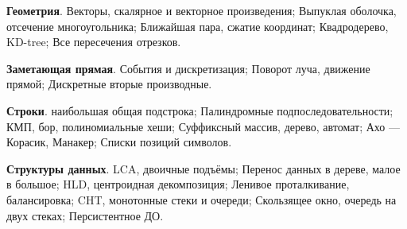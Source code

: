 \textbf{Геометрия}. Векторы, скалярное и векторное произведения; Выпуклая оболочка, отсечение многоугольника; Ближайшая пара, сжатие координат; Квадродерево, KD-tree; Все пересечения отрезков.

\textbf{Заметающая прямая}. События и дискретизация; Поворот луча, движение прямой; Дискретные вторые производные.

\textbf{Строки}. наибольшая общая подстрока; Палиндромные подпоследовательности; КМП, бор, полиномиальные хеши; Суффиксный массив, дерево, автомат; Ахо — Корасик, Манакер; Списки позиций символов.

\textbf{Структуры данных}. LCA, двоичные подъёмы; Перенос данных в дереве, малое в большое; HLD, центроидная декомпозиция; Ленивое проталкивание, балансировка; CHT, монотонные стеки и очереди; Скользящее окно, очередь на двух стеках; Персистентное ДО.
